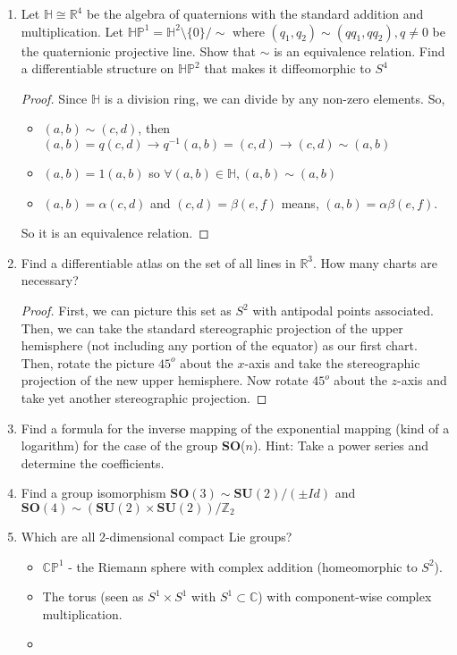 \documentclass[12pt]{amsart}
\begin{document}
\begin{enumerate}
\newpage
	\item Let $\mathbb{H}\cong\mathbb{R}^4$ be the algebra of quaternions with the standard addition and multiplication. Let $\mathbb{HP}^1=\mathbb{H}^2\setminus\{0\}/\sim$ where $(q_1,q_2)\sim(qq_1,qq_2),q\neq0$ be the quaternionic projective line. Show that $\sim$ is an equivalence relation. Find a differentiable structure on $\mathbb{HP}^2$ that makes it diffeomorphic to $S^4$
	\begin{proof}
		Since $\mathbb{H}$ is a division ring, we can divide by any non-zero elements. So,
		\begin{itemize}
		 	\item $(a,b)\sim(c,d)$, then $(a,b)=q(c,d)\rightarrow q^{-1}(a,b)=(c,d)\rightarrow (c,d)\sim(a,b)$
		 	\item $(a,b)=1(a,b)$ so $\forall(a,b)\in\mathbb{H},(a,b)\sim(a,b)$
		 	\item $(a,b)=\alpha(c,d)$ and $(c,d)=\beta(e,f)$ means, $(a,b)=\alpha\beta(e,f)$.
		\end{itemize}
		So it is an equivalence relation.
	\end{proof}

	\item Find a differentiable atlas on the set of all lines in $\mathbb{R}^3$. How many charts are necessary?

	\begin{proof}
		First, we can picture this set as $S^2$ with antipodal points associated. Then, we can take the standard stereographic projection of the upper hemisphere (not including any portion of the equator) as our first chart. Then, rotate the picture $45^o$ about the $x$-axis and take the stereographic projection of the new upper hemisphere. Now rotate $45^o$ about the $z$-axis and take yet another stereographic projection.
	\end{proof}

	\item Find a formula for the inverse mapping of the exponential mapping (kind of a logarithm) for the case of the group \textbf{SO}($n$). Hint: Take a power series and determine the coefficients.

	\item Find a group isomorphism $\textbf{SO}(3)\sim\textbf{SU}(2)/(\pm Id)$ and $\textbf{SO}(4)\sim(\textbf{SU}(2)\times\textbf{SU}(2))/\mathbb{Z}_2$

	\item Which are all 2-dimensional compact Lie groups?
	\begin{itemize}
		\item $\mathbb{CP}^1$ - the Riemann sphere with complex addition (homeomorphic to $S^2$).
		\item The torus (seen as $S^1\times S^1$ with $S^1\subset\mathbb{C}$) with component-wise complex multiplication.
		\item 
	\end{itemize}


\end{enumerate}
\end{document}
